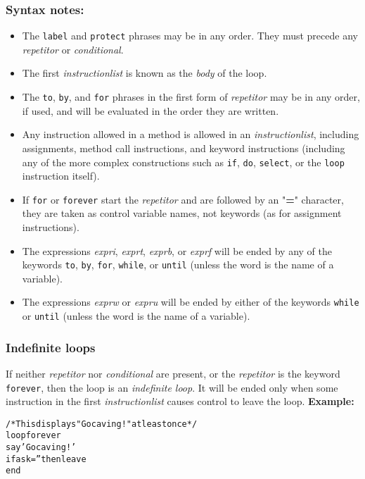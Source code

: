 \subsubsection{Syntax notes:}
\begin{itemize}
\item 
The \texttt{label} and \texttt{protect} phrases may be in any order.
They must precede any \emph{repetitor} or \emph{conditional}.
\item 
{}
The first \emph{instructionlist} is known as the \emph{body} of
the loop.
\item 
The \texttt{to}, \texttt{by}, and \texttt{for} phrases in the first form
of \emph{repetitor} may be in any order, if used, and will be
evaluated in the order they are written.
\item 
Any instruction allowed in a method is allowed in an
\emph{instructionlist}, including assignments, method call
instructions, and keyword instructions (including any of the more
complex constructions such as \texttt{if}, \texttt{do}, \texttt{select},
or the \texttt{loop} instruction itself).
\item 
If \texttt{for} or \texttt{forever} start the \emph{repetitor} and
are followed by an "\textbf{=}" character, they are taken as
control variable names, not keywords (as for assignment instructions).
\item 
The expressions \emph{expri}, \emph{exprt}, \emph{exprb}, or
\emph{exprf} will be ended by any of the keywords \texttt{to},
\texttt{by}, \texttt{for}, \texttt{while}, or \texttt{until} (unless
the word is the name of a variable).
\item 
The expressions \emph{exprw} or \emph{expru} will be ended by
either of the keywords \texttt{while} or \texttt{until} (unless the
word is the name of a variable).
\end{itemize}
\subsubsection{Indefinite loops}
 If neither \emph{repetitor} nor \emph{conditional} are
present, or the \emph{repetitor} is the keyword \texttt{forever},
then the loop is an \emph{indefinite loop}.
It will be ended only when some instruction in the first
\emph{instructionlist} causes control to leave the loop.
 \textbf{Example:}
\begin{alltt}
/* This displays "Go caving!" at least once */
loop forever
  say 'Go caving!'
  if ask='' then leave
  end
\end{alltt}
